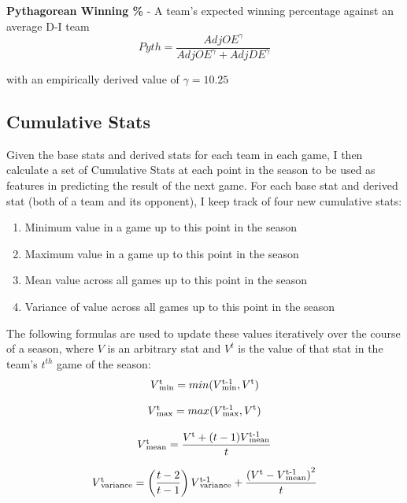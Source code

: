 \documentclass[]{article}
\def\SPSB#1#2{\rlap{\textsuperscript{#1}}\SB{#2}}
\def\SP#1{\textsuperscript{{#1}}}
\def\SB#1{\textsubscript{{#1}}}
\begin{document}
\textbf{Pythagorean Winning \%} - A team's expected winning percentage against an average D-I team
\begin{equation}
	Pyth = \frac{AdjOE^{\gamma}}{AdjOE^{\gamma} + AdjDE^{\gamma}}
\end{equation}

with an empirically derived value of $\gamma = 10.25$

\subsection{Cumulative Stats}

Given the base stats and derived stats for each team in each game, I then calculate a set of Cumulative Stats at each point in the season to be used as features in predicting the result of the next game. For each base stat and derived stat (both of a team and its opponent), I keep track of four new cumulative stats:

\begin{enumerate}
	\item Minimum value in a game up to this point in the season
	\item Maximum value in a game up to this point in the season
	\item Mean value across all games up to this point in the season
	\item Variance of value across all games up to this point in the season
\end{enumerate}

The following formulas are used to update these values iteratively over the course of a season, where $V$ is an arbitrary stat and $V^{t}$ is the value of that stat in the team's $t^{th}$ game of the season:
\begin{equation}
	V\SPSB{t}{min} = min(V\SPSB{t-1}{min}, V\SP{t})
\end{equation}

\begin{equation}
	V\SPSB{t}{max} = max(V\SPSB{t-1}{max}, V\SP{t})
\end{equation}

\begin{equation}
	V\SPSB{t}{mean} = \frac{V\SP{t} + (t-1)V\SPSB{t-1}{mean}}{t}	
\end{equation}

\begin{equation}
	V\SPSB{t}{variance} = \left(\frac{t-2}{t-1}\right)V\SPSB{t-1}{variance} + \frac{\left(V\SP{t}-V\SPSB{t-1}{mean}\right)^{2}}{t}	
\end{equation}
\end{document}
